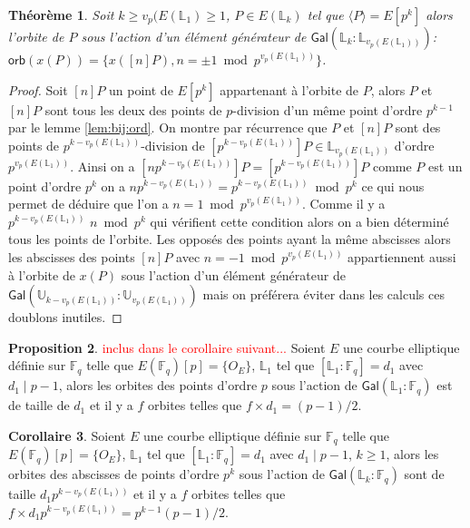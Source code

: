 \documentclass[10pt,a4paper]{book}
\theoremstyle{plain}
\newtheorem{thm}{Théorème}
\theoremstyle{definition}
\theoremstyle{definition}
\newtheorem{cor}[thm]{Corollaire}
\theoremstyle{definition}
\newtheorem{prop}[thm]{Proposition}
\theoremstyle{definition}
\theoremstyle{remark}
\theoremstyle{remark}
\begin{document}
\begin{thm}
\label{thm:orb:fro}
Soit $k\geqslant  v_p({E(\mathbb{L}_1)} \geqslant 1$,
 $P \in E(\mathbb{L}_{k})$ tel que $\langle P \rangle =E[p^k]$ 
 alors l'orbite de $P$ sous l'action d'un élément générateur
  de $\mathsf{Gal}(\mathbb{L}_{k}:\mathbb{L}_{v_p({E(\mathbb{L}_1)})})$:
   $\mathsf{orb}(x(P))=
   \{ x([n]P) , 
   n= \pm 1 \bmod p^{v_p({E(\mathbb{L}_1)})} \}$. 
\end{thm}

\begin{proof}
Soit $[n]P$ un point de $E[p^k]$ appartenant à l'orbite de $P$, alors $P$ et $[n]P$ sont tous les deux des points de $p$-division d'un même point d'ordre $p^{k-1}$ par le lemme \ref{lem:bij:ord}. On montre par récurrence que $P$ et $[n]P$ sont des points de $p^{k-v_p({E(\mathbb{L}_1)})}$-division de $[p^{k-v_p({E(\mathbb{L}_1)})}]P \in \mathbb{L}_{v_p({E(\mathbb{L}_1)})}$ d'ordre $p^{v_p(E(\mathbb{L}_1))}$. Ainsi on a $[np^{k-v_p(E(\mathbb{L}_1))}]P=[p^{k-v_p(E(\mathbb{L}_1))}]P$ comme $P$ est un point d'ordre $p^k$ on a $np^{k-v_p(E(\mathbb{L}_1))}=p^{k-v_p(E(\mathbb{L}_1))} \bmod p^k$ ce qui nous permet de déduire que l'on a $n=1 \bmod p^{v_p(E(\mathbb{L}_1))}$. Comme il y a $p^{k-v_p(E(\mathbb{L}_1))}$ $n \bmod p^k$ qui vérifient cette condition alors on a bien déterminé tous les points de l'orbite. Les opposés des points ayant la même abscisses alors les abscisses des points $[n]P$ avec $n=-1 \bmod p^{v_p(E(\mathbb{L}_1))}$ appartiennent aussi à l'orbite de $x(P)$ sous l'action d'un élément générateur de $\mathsf{Gal}(\mathbb{U}_{k-v_p(E(\mathbb{L}_1))}:\mathbb{U}_{v_p(E(\mathbb{L}_1))})$ mais on préférera éviter dans les calculs ces doublons inutiles.
\end{proof}

\begin{prop}
\textcolor{red}{inclus dans le corollaire suivant...}
Soient $E$ une courbe elliptique définie sur $\mathbb{F}_q$ telle que $E(\mathbb{F}_q)[p]=\{O_E\}$, $\mathbb{L}_1$ tel que $[\mathbb{L}_1:\mathbb{F}_q]=d_1$ avec $d_1 \mid p-1$, alors les orbites des points d'ordre $p$ sous l'action de $\mathsf{Gal}(\mathbb{L}_1:\mathbb{F}_q)$ est de taille de $d_1 $ et il y a $f$ orbites telles que $f \times d_1  = (p-1)/2$.
\end{prop}


\begin{cor}
Soient $E$ une courbe elliptique définie sur $\mathbb{F}_q$ telle que $E(\mathbb{F}_q)[p]=\{O_E\}$, $\mathbb{L}_1$ tel que $[\mathbb{L}_1:\mathbb{F}_q]=d_1$ avec $d_1 \mid p-1$, $k \geqslant 1$, alors les orbites des abscisses de points d'ordre $p^k$ sous l'action de $\mathsf{Gal}(\mathbb{L}_{k}:\mathbb{F}_q)$ sont de taille $d_1 p^{k-v_p(E(\mathbb{L}_1))}$ et il y a $f$ orbites telles que $f \times d_1 p^{k-v_p(E(\mathbb{L}_1))} = p^{k-1}(p-1)/2$.
\end{cor}
\end{document}
